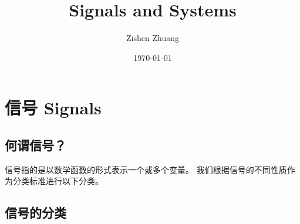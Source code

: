 \documentclass[UTF8]{article}
\title{\heiti Signals and Systems}
\author{\heiti Zishen Zhuang}
\date{\heiti \today}
\begin{document}
\maketitle

\section{信号 Signals}
\subsection{何谓信号？}
信号指的是以数学函数的形式表示一个或多个变量。
我们根据信号的不同性质作为分类标准进行以下分类。

\subsection{信号的分类}
\end{document}
